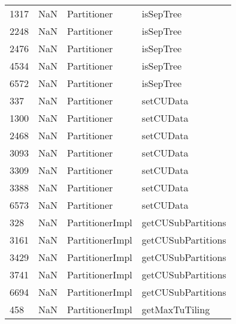 \begin{tabular}{llll}
1317 &                   NaN &                Partitioner &                                 isSepTree \\
2248 &                   NaN &                Partitioner &                                 isSepTree \\
2476 &                   NaN &                Partitioner &                                 isSepTree \\
4534 &                   NaN &                Partitioner &                                 isSepTree \\
6572 &                   NaN &                Partitioner &                                 isSepTree \\
337  &                   NaN &                Partitioner &                                 setCUData \\
1300 &                   NaN &                Partitioner &                                 setCUData \\
2468 &                   NaN &                Partitioner &                                 setCUData \\
3093 &                   NaN &                Partitioner &                                 setCUData \\
3309 &                   NaN &                Partitioner &                                 setCUData \\
3388 &                   NaN &                Partitioner &                                 setCUData \\
6573 &                   NaN &                Partitioner &                                 setCUData \\
328  &                   NaN &            PartitionerImpl &                        getCUSubPartitions \\
3161 &                   NaN &            PartitionerImpl &                        getCUSubPartitions \\
3429 &                   NaN &            PartitionerImpl &                        getCUSubPartitions \\
3741 &                   NaN &            PartitionerImpl &                        getCUSubPartitions \\
6694 &                   NaN &            PartitionerImpl &                        getCUSubPartitions \\
458  &                   NaN &            PartitionerImpl &                            getMaxTuTiling \\

\end{tabular}
